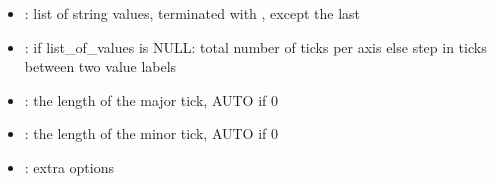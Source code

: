 \documentclass[letterpaper,10pt,english]{sphinxmanual}
\begin{document}
\begin{fulllineitems}
\begin{description}
\begin{itemize}
\item {} 
: list of string values, terminated with 
, except the last 


\item {} 
: if list\_of\_values is NULL: total number of ticks per axis else step in ticks between two value labels 

\item {} 
: the length of the major tick, AUTO if 0 

\item {} 
: the length of the minor tick, AUTO if 0 

\item {} 
: extra options 

\end{itemize}

\end{description}


\end{fulllineitems}

\end{document}
